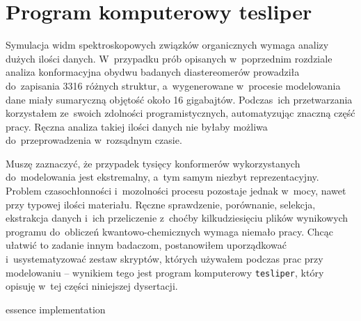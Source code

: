 \chapter{Program komputerowy tesliper}\label{chapter:tesliper}
Symulacja widm spektroskopowych związków organicznych wymaga analizy dużych ilości danych.
W~przypadku prób opisanych w~poprzednim rozdziale
  analiza konformacyjna obydwu badanych diastereomerów prowadziła do~zapisania 3316 różnych struktur, a~wygenerowane w~procesie modelowania
  dane miały sumaryczną objętość około 16 gigabajtów.
Podczas~ich przetwarzania korzystałem ze~swoich zdolności programistycznych, automatyzując
  znaczną część pracy.
Ręczna analiza takiej ilości danych nie byłaby możliwa do~przeprowadzenia w~rozsądnym czasie.

Muszę zaznaczyć, że przypadek tysięcy konformerów wykorzystanych do~modelowania jest
  ekstremalny, a~tym samym niezbyt reprezentacyjny.
Problem czasochłonności i~mozolności procesu pozostaje jednak w~mocy,
  nawet przy typowej ilości materiału.
Ręczne sprawdzenie, porównanie, selekcja, ekstrakcja danych i~ich przeliczenie z~choćby
  kilkudziesięciu plików wynikowych programu do~obliczeń kwantowo-chemicznych wymaga
  niemało pracy.
Chcąc ułatwić to zadanie innym badaczom, postanowiłem uporządkować i~usystematyzować
  zestaw skryptów, których używałem podczas prac przy modelowaniu \--- wynikiem tego jest
  program komputerowy \texttt{tesliper}, który opisuję w~tej części niniejszej dysertacji.

{essence}
{implementation}

